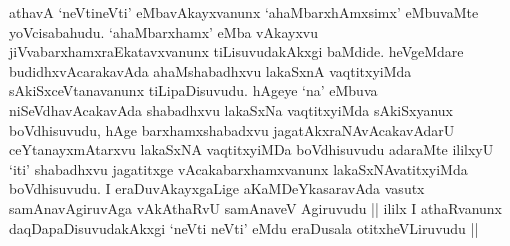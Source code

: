 \begin{artha}
athavA `neVtineVti' eMbavAkayxvanunx `ahaMbarxhAmxsimx' eMbuvaMte
yoVcisabahudu.  `ahaMbarxhamx' eMba vAkayxvu
jiVvabarxhamxraEkatavxvanunx tiLisuvudakAkxgi baMdide. heVgeMdare
budidhxvAcarakavAda ahaMshabadhxvu lakaSxnA vaqtitxyiMda
sAkiSxceVtanavanunx tiLipaDisuvudu. hAgeye `na' eMbuva
niSeVdhavAcakavAda shabadhxvu lakaSxNa vaqtitxyiMda sAkiSxyanux
boVdhisuvudu, hAge barxhamxshabadxvu jagatAkxraNAvAcakavAdarU
ceYtanayxmAtarxvu lakaSxNA vaqtitxyiMDa boVdhisuvudu adaraMte ililxyU
`iti' shabadhxvu jagatitxge vAcakabarxhamxvanunx lakaSxNAvatitxyiMda
boVdhisuvudu. I eraDuvAkayxgaLige aKaMDeYkasaravAda vasutx
samAnavAgiruvAga vAkAthaRvU samAnaveV Agiruvudu || ililx I athaRvanunx
daqDapaDisuvudakAkxgi `neVti neVti' eMdu eraDusala otitxheVLiruvudu ||
\end{artha}

\begin{center}


\end{center}

